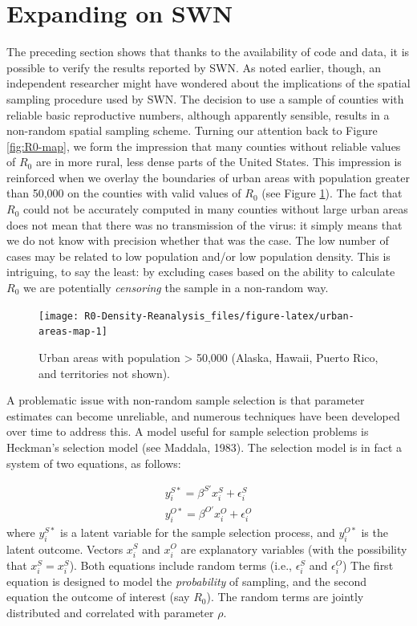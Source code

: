 \documentclass[]{elsarticle} %
\begin{document}
\hypertarget{expanding-on-swn}{%
\section{Expanding on SWN}\label{expanding-on-swn}}

The preceding section shows that thanks to the availability of code and
data, it is possible to verify the results reported by SWN. As noted
earlier, though, an independent researcher might have wondered about the
implications of the spatial sampling procedure used by SWN. The decision
to use a sample of counties with reliable basic reproductive numbers,
although apparently sensible, results in a non-random spatial sampling
scheme. Turning our attention back to Figure \ref{fig:R0-map}, we form
the impression that many counties without reliable values of \(R_0\) are
in more rural, less dense parts of the United States. This impression is
reinforced when we overlay the boundaries of urban areas with population
greater than 50,000 on the counties with valid values of \(R_0\) (see
Figure \ref{fig:urban-areas-map}). The fact that \(R_0\) could not be
accurately computed in many counties without large urban areas does not
mean that there was no transmission of the virus: it simply means that
we do not know with precision whether that was the case. The low number
of cases may be related to low population and/or low population density.
This is intriguing, to say the least: by excluding cases based on the
ability to calculate \(R_0\) we are potentially \emph{censoring} the
sample in a non-random way.

\begin{figure}
\texttt{[image: R0-Density-Reanalysis\_files/figure-latex/urban-areas-map-1]} \caption{\label{fig:urban-areas-map}Urban areas with population > 50,000 (Alaska, Hawaii, Puerto Rico, and territories not shown).}\label{fig:urban-areas-map}
\end{figure}

A problematic issue with non-random sample selection is that parameter
estimates can become unreliable, and numerous techniques have been
developed over time to address this. A model useful for sample selection
problems is Heckman's selection model (see Maddala, 1983). The selection
model is in fact a system of two equations, as follows:

\[
\begin{array}{c}
y_i^{S*} = \beta^{S\prime}x_i^S+\epsilon_i^S\\
y_i^{O*} = \beta^{O\prime}x_i^O+\epsilon_i^O
\end{array}
\] \noindent where \(y_i^{S*}\) is a latent variable for the sample
selection process, and \(y_i^{O*}\) is the latent outcome. Vectors
\(x_i^S\) and \(x_i^O\) are explanatory variables (with the possibility
that \(x_i^S = x_i^S\)). Both equations include random terms (i.e.,
\(\epsilon_i^S\) and \(\epsilon_i^O\)) The first equation is designed to
model the \emph{probability} of sampling, and the second equation the
outcome of interest (say \(R_0\)). The random terms are jointly
distributed and correlated with parameter \(\rho\).
\end{document}
